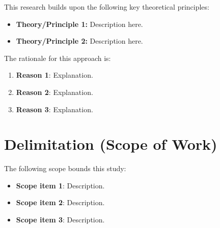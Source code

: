 
This research builds upon the following key theoretical principles:
\begin{itemize}
    \item \textbf{Theory/Principle 1:} Description here.
    \item \textbf{Theory/Principle 2:} Description here.
\end{itemize}

The rationale for this approach is:
\begin{enumerate}
    \item \textbf{Reason 1}: Explanation.
    \item \textbf{Reason 2}: Explanation.
    \item \textbf{Reason 3}: Explanation.
\end{enumerate}

\section{Delimitation (Scope of Work)}

The following scope bounds this study:
\begin{itemize}
    \item \textbf{Scope item 1}: Description.
    \item \textbf{Scope item 2}: Description.
    \item \textbf{Scope item 3}: Description.
\end{itemize}
